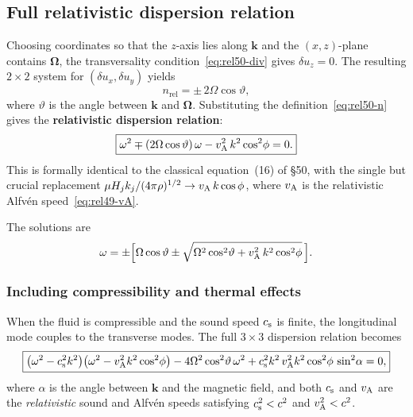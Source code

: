 \subsection{Full relativistic dispersion relation}

Choosing coordinates so that the $z$-axis lies along $\mathbf{k}$ and the
$(x,z)$-plane contains $\boldsymbol{\Omega}$, the transversality
condition~\eqref{eq:rel50-div} gives $\delta u_{z}=0$.  The resulting
$2\times 2$ system for $(\delta u_{x},\delta u_{y})$ yields
\begin{equation}
  n_{\mathrm{rel}} = \pm\,2\Omega\cos\vartheta,
  \label{eq:rel50-n-result}
\end{equation}
where $\vartheta$ is the angle between $\mathbf{k}$ and
$\boldsymbol{\Omega}$.  Substituting the
definition~\eqref{eq:rel50-n} gives the \textbf{relativistic dispersion
relation}:
\begin{equation}
  \boxed{%
    \omega^{2}
    \mp (2\Omega\cos\vartheta)\,\omega
    - \vA^{2}\,k^{2}\cos^{2}\!\phi
    = 0.
  }
  \label{eq:rel50-dispersion}
\end{equation}
This is formally identical to the classical equation~(16) of \S50, with
the single but crucial replacement
$\mu H_{j}k_{j}/(4\pi\rho)^{1/2}\to v_{\mathrm{A}}\,k\cos\phi$, where $v_{\mathrm{A}}$ is the
relativistic Alfv\'en speed~\eqref{eq:rel49-vA}.

The solutions are
\begin{equation}
  \omega = \pm\Bigl[
    \Omega\cos\vartheta
    \pm\sqrt{\Omega^{2}\cos^{2}\!\vartheta
      + v_{\mathrm{A}}^{2}\,k^{2}\cos^{2}\!\phi}
  \,\Bigr].
  \label{eq:rel50-roots}
\end{equation}

\subsubsection{Including compressibility and thermal effects}

When the fluid is compressible and the sound speed $c_{\mathrm{s}}$ is finite, the
longitudinal mode couples to the transverse modes.  The full
$3\times 3$ dispersion relation becomes
\begin{equation}
  \boxed{%
    \bigl(\omega^{2} - \cs^{2}k^{2}\bigr)
    \bigl(\omega^{2} - \vA^{2}k^{2}\cos^{2}\!\phi\bigr)
    - 4\Omega^{2}\cos^{2}\!\vartheta\,\omega^{2}
    + \cs^{2}k^{2}\,\vA^{2}k^{2}\cos^{2}\!\phi\,\sin^{2}\!\alpha
    = 0,
  }
  \label{eq:rel50-full-dispersion}
\end{equation}
where $\alpha$ is the angle between $\mathbf{k}$ and the magnetic field,
and both $c_{\mathrm{s}}$ and $v_{\mathrm{A}}$ are the \emph{relativistic} sound and Alfv\'en
speeds satisfying $c_{\mathrm{s}}^{2}<c^{2}$ and $v_{\mathrm{A}}^{2}<c^{2}$.

